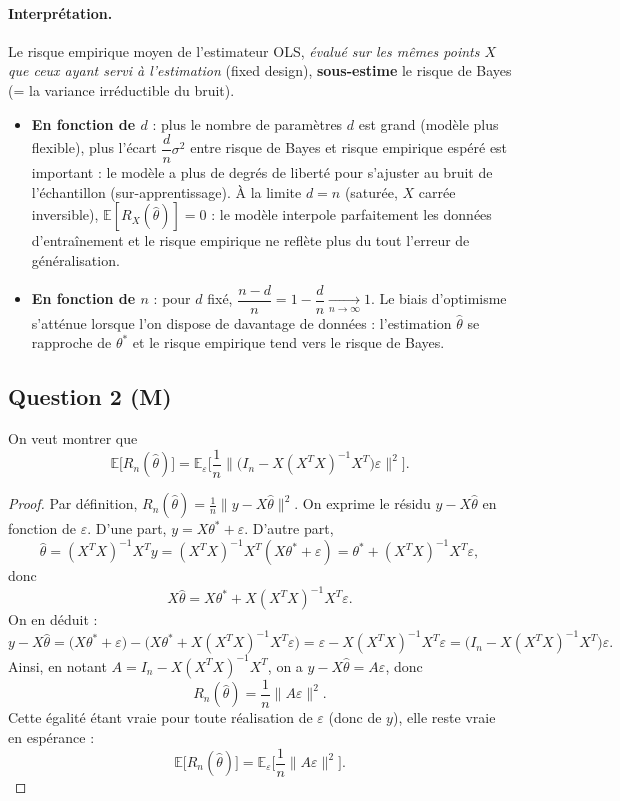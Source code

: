 \documentclass[11pt]{article}
\theoremstyle{remark}
\newcommand{\E}{\mathbb{E}}
\begin{document}
	\paragraph{Interprétation.}
	Le risque empirique moyen de l'estimateur OLS, \emph{évalué sur les mêmes points $X$ que ceux ayant servi à l'estimation} (fixed design), \textbf{sous-estime} le risque de Bayes (= la variance irréductible du bruit). 
	\begin{itemize}
		\item \textbf{En fonction de $d$} : plus le nombre de paramètres $d$ est grand (modèle plus flexible), plus l'écart $\dfrac{d}{n}\sigma^2$ entre risque de Bayes et risque empirique espéré est important : le modèle a plus de degrés de liberté pour s'ajuster au bruit de l'échantillon (sur-apprentissage). À la limite $d=n$ (saturée, $X$ carrée inversible), $\E[R_X(\hat\theta)] = 0$ : le modèle interpole parfaitement les données d'entraînement et le risque empirique ne reflète plus du tout l'erreur de généralisation.
		\item \textbf{En fonction de $n$} : pour $d$ fixé, $\dfrac{n-d}{n} = 1-\dfrac{d}{n} \xrightarrow[n\to\infty]{} 1$. Le biais d'optimisme s'atténue lorsque l'on dispose de davantage de données : l'estimation $\hat\theta$ se rapproche de $\theta^*$ et le risque empirique tend vers le risque de Bayes.
	\end{itemize}
	
	\subsection*{Question 2 (M)}
	
	On veut montrer que
	\[
	\E\big[R_n(\hat\theta)\big] = \E_\varepsilon\Big[\frac{1}{n}\big\|\big(I_n - X(X^TX)^{-1}X^T\big)\varepsilon\big\|^2\Big].
	\]
	
	\begin{proof}
		Par définition, $R_n(\hat\theta) = \frac1n \|y - X\hat\theta\|^2$. On exprime le résidu $y-X\hat\theta$ en fonction de $\varepsilon$. D'une part, $y = X\theta^* + \varepsilon$. D'autre part,
		\[
		\hat\theta = (X^TX)^{-1}X^Ty = (X^TX)^{-1}X^T(X\theta^*+\varepsilon) = \theta^* + (X^TX)^{-1}X^T\varepsilon,
		\]
		donc
		\[
		X\hat\theta = X\theta^* + X(X^TX)^{-1}X^T\varepsilon.
		\]
		On en déduit :
		\[
		y - X\hat\theta = \big(X\theta^* + \varepsilon\big) - \big(X\theta^* + X(X^TX)^{-1}X^T\varepsilon\big) = \varepsilon - X(X^TX)^{-1}X^T\varepsilon = \big(I_n - X(X^TX)^{-1}X^T\big)\varepsilon.
		\]
		Ainsi, en notant $A = I_n - X(X^TX)^{-1}X^T$, on a $y-X\hat\theta = A\varepsilon$, donc
		\[
		R_n(\hat\theta) = \frac1n\|A\varepsilon\|^2.
		\]
		Cette égalité étant vraie pour toute réalisation de $\varepsilon$ (donc de $y$), elle reste vraie en espérance :
		\[
		\E\big[R_n(\hat\theta)\big] = \E_\varepsilon\Big[\frac1n\|A\varepsilon\|^2\Big].
		\]
	\end{proof}
	
\end{document}
